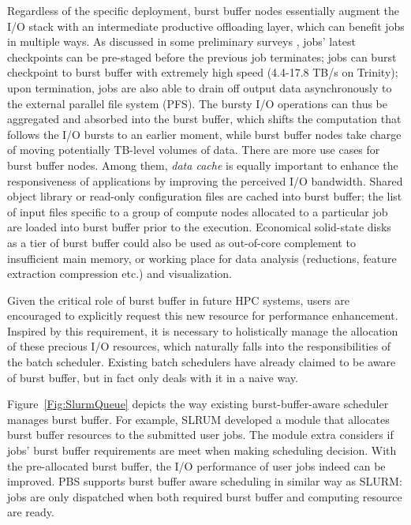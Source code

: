 Regardless of the specific deployment, burst buffer nodes essentially augment
the I/O stack with an intermediate productive offloading layer, 
which can benefit jobs in multiple ways.
As discussed in some preliminary surveys\cite{apex-workflow} ,
jobs' latest checkpoints can be pre-staged
before the previous job terminates;
jobs can burst checkpoint to burst buffer
with extremely high speed (4.4-17.8 TB/s on Trinity);
upon termination, jobs are also able to drain off output data
asynchronously to the external parallel file system (PFS).
The bursty I/O operations can thus be aggregated and absorbed into the burst buffer,
which shifts the computation that follows the I/O bursts to an earlier moment,
while burst buffer nodes take charge of moving potentially TB-level volumes of data.
There are more use cases for burst buffer nodes.
Among them, \textit{data cache} is equally important to enhance the responsiveness
of applications by improving the perceived I/O bandwidth\cite{TrinitySystem}.
Shared object library or read-only configuration files are cached into burst buffer;
the list of input files specific to a group of compute nodes allocated to
a particular job are loaded into burst buffer prior to the execution.
Economical solid-state disks as a tier of burst buffer could also be used as
out-of-core complement to insufficient main memory\cite{Romanus:CORR:15},
or working place for data analysis (reductions, feature extraction compression etc.)
and visualization\cite{TrinitySystem}.

Given the critical role of burst buffer in future HPC systems,
users are encouraged to explicitly request this new resource for performance enhancement\cite{apex-workflow}.
Inspired by this requirement, it is necessary to holistically manage
the allocation of these precious I/O resources,
which naturally falls into the responsibilities of the batch scheduler.
Existing batch schedulers \cite{Moab, Cobalt, SlurmBBGuide, PBSonCRAY} have already claimed to
be aware of burst buffer, but in fact only deals with it in a naive way.

Figure~\ref{Fig:SlurmQueue} depicts the way existing burst-buffer-aware scheduler manages burst buffer.
For example, SLRUM developed a module that allocates burst buffer resources to the submitted user jobs.
The module extra considers if jobs' burst buffer requirements are meet when making scheduling decision.
With the pre-allocated burst buffer,
the I/O performance of user jobs indeed can be improved\cite{SlurmBBGuide}.
PBS supports burst buffer aware scheduling in similar way as SLURM:
jobs are only dispatched when both required burst buffer and computing resource are ready\cite{PBSonCRAY}.

